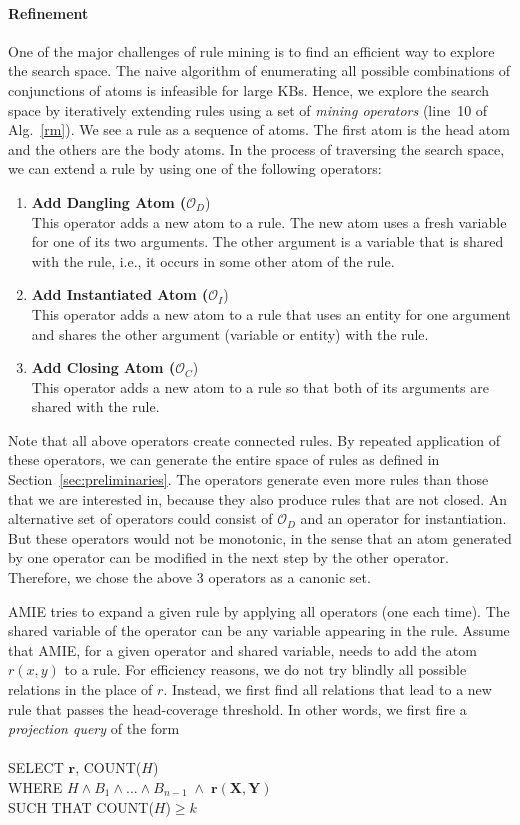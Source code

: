 \paragraph{Refinement}\label{subsubsec:refinement}
One of the major challenges of rule mining is to find an efficient way to explore the search space. 
The naive algorithm of enumerating all possible combinations of conjunctions of atoms is infeasible for large KBs.
Hence, we explore the search space by iteratively extending rules using a set of \emph{mining operators} (line~10 of Alg.~\ref{rm}).
We see a rule as a sequence of atoms. The first atom is the head atom and the others are the body atoms. 
In the process of traversing the search space, we can extend a rule by using one of the following operators:
\begin{enumerate}
\item \textbf{Add Dangling Atom ($\mathcal{O}_D$})\\
This operator adds a new atom to a rule. The new atom uses a fresh variable for one of its two arguments. The other argument is a variable
that is shared with the rule, i.e., it occurs in some other atom of the rule.
\item \textbf{Add Instantiated Atom ($\mathcal{O}_I$})\\
This operator adds a new atom to a rule that uses an entity for one argument and shares the other argument (variable or entity) with the rule.
\item \textbf{Add Closing Atom ($\mathcal{O}_C$})\\
This operator adds a new atom to a rule so that both of its arguments are shared with the rule.
\end{enumerate}
Note that all above operators create connected rules.
By repeated application of these operators, we can generate the entire space of rules as defined in Section~\ref{sec:preliminaries}.
The operators generate even more rules than those that we are interested in, because they also produce rules that are not closed.
An alternative set of operators could consist of $\mathcal{O}_D$ and an operator for instantiation.
But these operators would not be monotonic, in the sense that an atom generated by one operator can be modified in the next step by the other operator.
Therefore, we chose the above 3 operators as a canonic set.


AMIE tries to expand a given rule by applying all operators (one each time). The shared variable of the operator can be any variable appearing in the rule.
Assume that AMIE, for a given operator and shared variable, needs to add the atom $r(x,y)$ to a rule. 
For efficiency reasons, we do not try blindly all possible relations in the place of $r$. Instead, we first 
find all relations that lead to a new rule that passes the head-coverage threshold.
In other words, we first fire a \emph{projection query} of the form
\\ \\
SELECT $\bm{r}$, COUNT($H$)\\
WHERE $H \wedge B_1 \wedge ... \wedge B_{n-1}\; \wedge\; \bm{r}(\bm{X},\bm{Y})$\\
SUCH THAT COUNT($H$)$\geq k$
\\ \\

